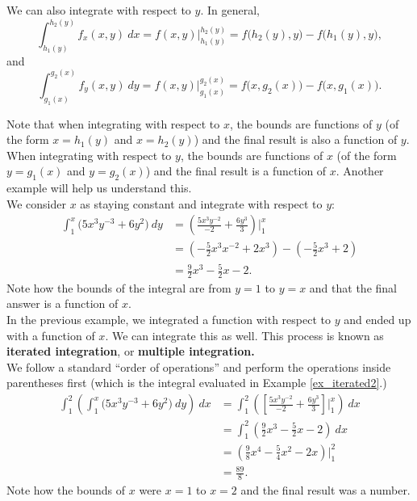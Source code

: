 We can also integrate with respect to $y$. In general,
$$\int_{h_1(y)}^{h_2(y)} f_x(x,y)\ dx = f(x,y)\Big|_{h_1(y)}^{h_2(y)} = f\big(h_2(y),y\big)-f\big(h_1(y),y\big),$$
and
$$\int_{g_1(x)}^{g_2(x)} f_y(x,y)\ dy = f(x,y)\Big|_{g_1(x)}^{g_2(x)} = f\big(x,g_2(x)\big)-f\big(x,g_1(x)\big).$$

Note that when integrating with respect to $x$, the bounds are functions of $y$ (of the form $x=h_1(y)$ and $x=h_2(y)$) and the final result is also a function of $y$. When integrating with respect to $y$, the bounds are functions of $x$ (of the form $y=g_1(x)$ and $y=g_2(x)$) and the final result is a function of $x$. Another example will help us understand this.\\

{We consider $x$ as staying constant and integrate with respect to $y$:
\begin{align*}
\int_1^x\big(5x^3y^{-3}+6y^2\big)\ dy & = \left(\frac{5x^3y^{-2}}{-2}+\frac{6y^3}{3}\right)\Bigg|_1^x \\
						&= \left(-\frac52x^3x^{-2}+2x^3\right) - \left(-\frac52x^3+2\right) \\
						&= \frac92x^3-\frac52x-2.
\end{align*}
Note how the bounds of the integral are from $y=1$ to $y=x$ and that the final answer is a function of $x$.
}\\

In the previous example, we integrated a function with respect to $y$ and ended up with a function of $x$. We can integrate this as well. This process is known as \textbf{iterated integration}, or \textbf{multiple integration.}\\

{We follow a standard ``order of operations'' and perform the operations inside parentheses first (which is the integral evaluated in Example \ref{ex_iterated2}.)
\begin{align*}
\int_1^2\left(\int_1^x\big(5x^3y^{-3}+6y^2\big)\ dy\right)\ dx &= \int_1^2 \left(\left[\frac{5x^3y^{-2}}{-2}+\frac{6y^3}{3}\right]\Bigg|_1^x\right)\ dx \\
			&= \int_1^2 \left(\frac92x^3-\frac52x-2\right)\ dx \\
			&= \left(\frac98x^4-\frac54x^2-2x\right)\Bigg|_1^2\\
			&= \frac{89}8.
\end{align*}
Note how the bounds of $x$ were $x=1$ to $x=2$ and the final result was a number.
}\\

